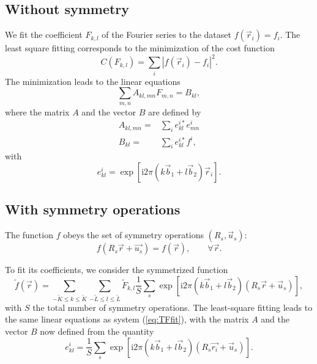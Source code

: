 \documentclass[a4paper]{article}
\newcommand{\mi}{\mathrm{i}}
\begin{document}
\subsection*{Without symmetry}

We fit the coefficient $F_{k,l}$ of the Fourier series 
to the dataset $f(\vec{r}_i)=f_i$. 
The least square fitting corresponds to the minimization 
of the cost function
\begin{equation*}
	C(F_{k,l}) = \sum_i{ \left| f(\vec{r}_i) - f_i \right|^2}.
\end{equation*}
The minimization leads to the linear equations
\begin{equation}
	\sum_{m,n}{ A_{kl,mn} F_{m,n} } = B_{kl},
	\label{eq:TFfit}
\end{equation}
where the matrix $A$ and the vector $B$ are defined by
\begin{align*}
	A_{kl,mn} = & \sum_i{ e^{i*}_{kl}e^{i}_{mn}} \\
	B_{kl}    = & \sum_i{ e^{i*}_{kl}f^{i}},
\end{align*}
with
\begin{equation*}
	e^{i}_{kl} = \exp{\left[ \mi 2\pi \left( k\vec{b}_1 + l\vec{b}_2 \right)\vec{r}_i \right] }.
\end{equation*}

\subsection*{With symmetry operations}

The function $f$ obeys the set of symmetry operations $(R_s, \vec{u}_s)$:
\begin{equation*}
	f(R_s\vec{r}+\vec{u_s}) = f(\vec{r}),\qquad \forall \vec{r}.
\end{equation*}

To fit its coefficients, we consider the symmetrized function
\begin{equation}
	\tilde{f}(\vec{r}) = \sum_{-\tilde{K} \leq k \leq \tilde{K}}{ \sum_{-\tilde{L} \leq l \leq \tilde{L}}{ \tilde{F}_{k,l} 
		\frac{1}{S}\sum_s{ \exp{\left[ \mi 2\pi \left( k\vec{b}_1 + l\vec{b}_2 \right)
				\left(R_s\vec{r} +\vec{u}_s\right) \right] } }
		}},
	\label{eq:TFcmplx_sym}
\end{equation}
with $S$ the total number of symmetry operations.
The least-square fitting leads to the same linear equations as system (\ref{eq:TFfit}),
with the matrix $A$ and the vector $B$ now defined from the quantity
\begin{equation*}
	e^{i}_{kl} = \frac{1}{S} \sum_s{ \exp{\left[ \mi 2\pi \left( k\vec{b}_1 + l\vec{b}_2 \right)
				\left(R_s\vec{r_i} +\vec{u}_s\right) \right] } }.
\end{equation*}
\end{document}
